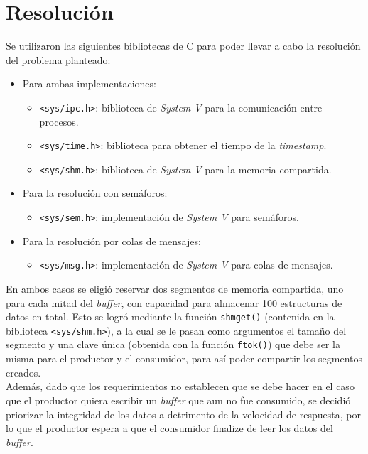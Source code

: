 \section{Resolución}

Se utilizaron las siguientes bibliotecas de C para poder llevar a cabo la resolución del problema planteado:
\begin{itemize}
    \item Para ambas implementaciones:
    \begin{itemize}
        \item \texttt{<sys/ipc.h>}: biblioteca de \textit{System V} para la comunicación entre procesos.
        \item \texttt{<sys/time.h>}: biblioteca para obtener el tiempo de la \textit{timestamp}.
        \item \texttt{<sys/shm.h>}: biblioteca de \textit{System V} para la memoria compartida.
    \end{itemize}
    \item Para la resolución con semáforos:
    \begin{itemize}
        \item \texttt{<sys/sem.h>}: implementación de \textit{System V} para semáforos.
    \end{itemize}
    \item Para la resolución por colas de mensajes:
    \begin{itemize}
        \item \texttt{<sys/msg.h>}: implementación de \textit{System V} para colas de mensajes.\\
    \end{itemize}
\end{itemize}

En ambos casos se eligió reservar dos segmentos de memoria compartida, uno para cada mitad del \textit{buffer}, con capacidad para almacenar 100 estructuras de datos en total. Esto se logró mediante la función \texttt{shmget()} (contenida en la biblioteca \texttt{<sys/shm.h>}), a la cual se le pasan como argumentos el tamaño del segmento y una clave única (obtenida con la función \texttt{ftok()}) que debe ser la misma para el productor y el consumidor, para así poder compartir los segmentos creados.\\

Además, dado que los requerimientos no establecen que se debe hacer en el caso que el productor quiera escribir un \textit{buffer} que aun no fue consumido, se decidió priorizar la integridad de los datos a detrimento de la velocidad de respuesta, por lo que el productor espera a que el consumidor finalize de leer los datos del \textit{buffer}.\\


